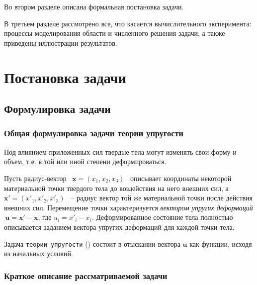 \documentclass[a4paper, 14pt]{extreport}
\begin{document}
Во втором разделе описана формальная постановка задачи.

В третьем разделе рассмотрено все, что касается вычислительного эксперимента:
процессы моделирования области и численного решения задачи, а также 
приведены иллюстрации результатов.


\newpage
\chapter{Постановка задачи}
\section{Формулировка задачи}
\subsection{Общая формулировка задачи теории упругости}


Под влиянием приложенных сил твердые тела могут изменять свои форму и объем, 
т.е. в той или иной степени деформироваться.

Пусть радиус-вектор \, $\textbf{x} = (x_1, x_2, x_3)$ \, описывает координаты 
некоторой материальной точки твердого тела до воздействия на него внешних сил,
а \, $\textbf{x}' = (x'_1, x'_2, x'_3)$ \, -- радиус вектор той же материальной
точки после действия внешних сил. Перемещение точки характеризуется 
\textit{вектором упругих деформаций} \,$\textbf{u} = \textbf{x}' - \textbf{x}$, 
где  $u_i = x'_i - x_i$. Деформированное состояние тела
полностью описывается заданием вектора упругих деформаций для каждой точки тела.

Задача \texttt{теории упругости} (\cite{math_elasticity_theory}) состоит в 
отыскании вектора $\textbf{u}$ как функции, исходя из начальных условий.

\subsection{Краткое описание рассматриваемой задачи}
\end{document}
